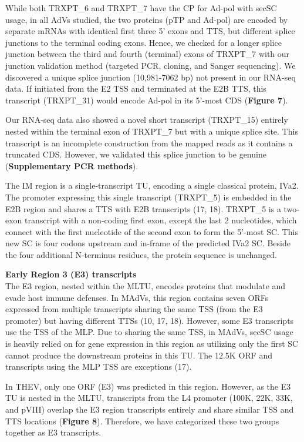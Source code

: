 \documentclass[
]{article}
\begin{document}
While both TRXPT\_6 and TRXPT\_7 have the CP for Ad-pol with secSC
usage, in all AdVs studied, the two proteins (pTP and Ad-pol) are
encoded by separate mRNAs with identical first three 5' exons and TTS,
but different splice junctions to the terminal coding exons. Hence, we
checked for a longer splice junction between the third and fourth
(terminal) exons of TRXPT\_7 with our junction validation method
(targeted PCR, cloning, and Sanger sequencing). We discovered a unique
splice junction (10,981-7062 bp) not present in our RNA-seq data. If
initiated from the E2 TSS and terminated at the E2B TTS, this transcript
(TRXPT\_31) would encode Ad-pol in its 5'-most CDS (\textbf{Figure 7}).

Our RNA-seq data also showed a novel short transcript (TRXPT\_15)
entirely nested within the terminal exon of TRXPT\_7 but with a unique
splice site. This transcript is an incomplete construction from the
mapped reads as it contains a truncated CDS. However, we validated this
splice junction to be genuine (\textbf{Supplementary PCR methods}).

The IM region is a single-transcript TU, encoding a single classical
protein, IVa2. The promoter expressing this single transcript (TRXPT\_5)
is embedded in the E2B region and shares a TTS with E2B transcripts (17,
18). TRXPT\_5 is a two-exon transcript with a non-coding first exon,
except the last 2 nucleotides, which connect with the first nucleotide
of the second exon to form the 5'-most SC. This new SC is four codons
upstream and in-frame of the predicted IVa2 SC. Beside the four
additional N-terminus residues, the protein sequence is unchanged.

\textbf{Early Region 3 (E3) transcripts}\\
The E3 region, nested within the MLTU, encodes proteins that modulate
and evade host immune defenses. In MAdVs, this region contains seven
ORFs expressed from multiple transcripts sharing the same TSS (from the
E3 promoter) but having different TTSs (10, 17, 18). However, some E3
transcripts use the TSS of the MLP. Due to sharing the same TSS, in
MAdVs, secSC usage is heavily relied on for gene expression in this
region as utilizing only the first SC cannot produce the downstream
proteins in this TU. The 12.5K ORF and transcripts using the MLP TSS are
exceptions (17).

In THEV, only one ORF (E3) was predicted in this region. However, as the
E3 TU is nested in the MLTU, transcripts from the L4 promoter (100K,
22K, 33K, and pVIII) overlap the E3 region transcripts entirely and
share similar TSS and TTS locations (\textbf{Figure 8}). Therefore, we
have categorized these two groups together as E3 transcripts.
\end{document}
